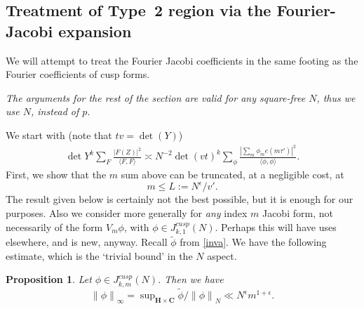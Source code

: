 \documentclass[11pt]{amsart}
\numberwithin{equation}{section}
\theoremstyle{plain}
\newtheorem{prop}[thm]{Proposition}
\theoremstyle{definition}
\newcommand{\C}{\mf C}
\newcommand{\h}{\mf H}
\newcommand{\mf}{\mathbf}
\newcommand*{\norm}[1]{\left\lVert#1\right\rVert}
\newcommand{\lan}{\langle }
\newcommand{\ran}{\rangle}
\newcommand{\sumn}{\sum \nolimits}
\newcommand{\jkmc}{J_{k,m}^{cusp}}
\newcommand{\jkn}{J^{cusp}_{k,1}(N)}
\begin{document}
\subsection{Treatment of Type~2 region via the Fourier-Jacobi expansion}

We will attempt to treat the Fourier Jacobi coefficients in the same footing as the Fourier coefficients of cusp forms. 

\textit{The arguments for the rest of the section are valid for any square-free $N$, thus we use $N$, instead of $p$}. 

We start with (note that $tv=\det(Y)$)
\begin{align} \label{m-sum-phi}
    \det Y^k \sumn_F \frac{|F(Z)|^2}{\lan F,F \ran} \asymp N^{-2} \det (v t)^k \sumn_\phi \frac{ |\sumn_m \phi_m e(m \tau')|^2}{\lan \phi,\phi \ran}.
\end{align}
First, we show that the $m$ sum above can be truncated, at a negligible cost, at 
\begin{equation} \label{l-def}
    m \le L:=N^\epsilon/v'. 
\end{equation}
The result given below is certainly not the best possible, but it is enough for our purposes. Also we consider more generally for \textit{any} index $m$ Jacobi form, not necessarily of the form $V_m \phi$, with $\phi \in \jkn$. Perhaps this will have uses elsewhere, and is new, anyway. Recall $\widetilde{\phi}$ from \eqref{inva}. We have the following estimate, which is the `trivial bound' in the  $N$ aspect.

\begin{prop} \label{phi-crude}
    Let $\phi \in \jkmc(N)$. Then we have 
    \begin{equation}
        \norm{\phi}_\infty = \sup\nolimits_{\h \times\C} \widetilde \phi/\norm{\phi}_N \ll N^{\epsilon} m^{1+\epsilon}.
    \end{equation}
\end{prop}
\end{document}
